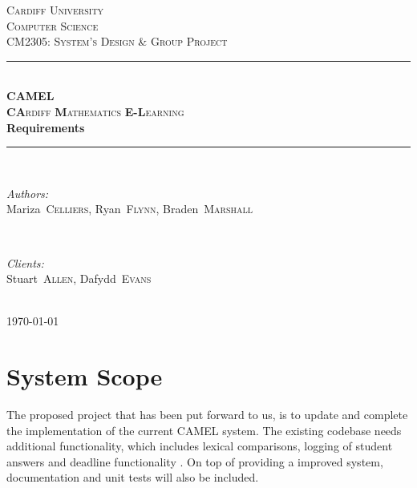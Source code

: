 \documentclass[12pt]{article}
\begin{document}
	\begin{titlepage}
		\newcommand{\HRule}{\rule{\linewidth}{0.5mm}}

		\center

		\textsc{\LARGE Cardiff University}\\[1.5cm]
		\textsc{\Large Computer Science}\\[0.5cm]
		\textsc{\large CM2305: System's Design \& Group Project}\\[0.5cm]

		\HRule \\[0.4cm]
		\textsc{\Large \textbf{CAMEL}}\\[0.1cm]
		\textsc{\Large \textbf{CA}rdiff \textbf{M}athematics \textbf{E-L}earning}\\[0.7cm]
		{\huge\bfseries Requirements}\\[0.4cm]
		\HRule \\[1.5cm]

		\begin{minipage}{0.4\textwidth}
			\begin{flushleft} \large
				\emph{Authors:}\\
				\mbox{Mariza \textsc{Celliers}}, \mbox{Ryan \textsc{Flynn}}, \mbox{Braden \textsc{Marshall}}
			\end{flushleft}
		\end{minipage}
		~
		\begin{minipage}{0.4\textwidth}
			\begin{flushright} \large
				\emph{Clients:} \\
				\mbox{Stuart \textsc{Allen}}, \mbox{Dafydd \textsc{Evans}}
			\end{flushright}
		\end{minipage}\\[3cm]

		{\large \today}\\[2cm]

		\vfill
	\end{titlepage}


	\tableofcontents

	\newpage
	\section{System Scope}
	The proposed project that has been put forward to us, is to update and complete the implementation of the current CAMEL system. The existing codebase needs additional functionality, which includes lexical comparisons, logging of student answers and deadline functionality . On top of providing a improved system, documentation and unit tests will also be included.
\end{document}
